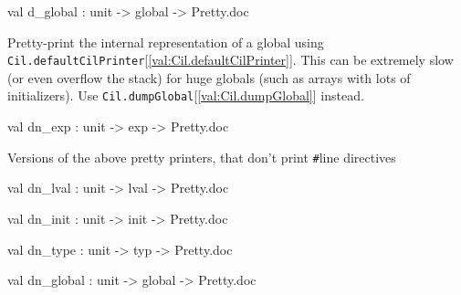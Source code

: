 \documentclass[11pt]{article}
\begin{document}
\label{val:Cil.d-underscoreglobal}\begin{ocamldoccode}
val d_global : unit -> global -> Pretty.doc
\end{ocamldoccode}
\begin{ocamldocdescription}
Pretty-print the internal representation of a global using 
 {\tt{Cil.defaultCilPrinter}}[\ref{val:Cil.defaultCilPrinter}]. This can be extremely slow (or even overflow the 
 stack) for huge globals (such as arrays with lots of initializers). Use 
 {\tt{Cil.dumpGlobal}}[\ref{val:Cil.dumpGlobal}] instead.


\end{ocamldocdescription}




\label{val:Cil.dn-underscoreexp}\begin{ocamldoccode}
val dn_exp : unit -> exp -> Pretty.doc
\end{ocamldoccode}
\begin{ocamldocdescription}
Versions of the above pretty printers, that don't print \verb`#`line directives


\end{ocamldocdescription}




\label{val:Cil.dn-underscorelval}\begin{ocamldoccode}
val dn_lval : unit -> lval -> Pretty.doc
\end{ocamldoccode}




\label{val:Cil.dn-underscoreinit}\begin{ocamldoccode}
val dn_init : unit -> init -> Pretty.doc
\end{ocamldoccode}




\label{val:Cil.dn-underscoretype}\begin{ocamldoccode}
val dn_type : unit -> typ -> Pretty.doc
\end{ocamldoccode}




\label{val:Cil.dn-underscoreglobal}\begin{ocamldoccode}
val dn_global : unit -> global -> Pretty.doc
\end{ocamldoccode}
\end{document}
